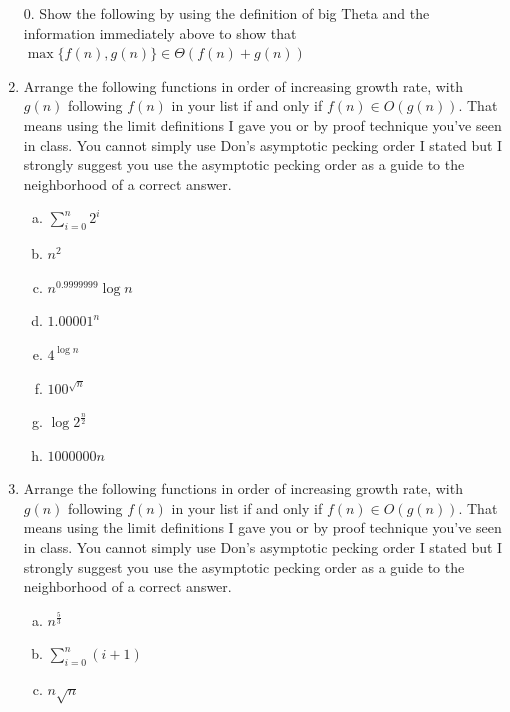 \documentclass[12pt]{article}
\begin{document}
\begin{enumerate}
\item[0. ] Show the following by using the definition of big Theta and the information immediately above to show that $\max\{f(n),g(n)\}\in\Theta(f(n) + g(n))$
\newpage
\item Arrange the following functions in order of increasing growth rate, with $g(n)$ following $f(n)$ 
in your list if and only if $f(n) \in O(g(n))$. That means using the limit definitions I gave you or by proof 
technique you've seen in class. You cannot simply use Don's asymptotic pecking order I stated but I strongly 
suggest you use the asymptotic pecking order as a guide to the neighborhood of a correct answer.\\
\begin{enumerate}[a)]
\item $\sum\limits_{i = 0}^{n} 2^i$\\
\item $n^2$\\
\item $n^{0.9999999}\log{n}$\\
\item $1.00001^n$\\
\item $4^{\log{n}}$\\
\item $100^{\sqrt{n}}$\\
\item $\log{2^{\frac{n}{2}}}$\\
\item $1000000n$\\
\end{enumerate}
\newpage
\item Arrange the following functions in order of increasing growth rate, with $g(n)$ following $f(n)$ in your list if and only if $f(n) \in O(g(n))$. That means using the limit definitions I gave you or by proof technique you've seen in class. You cannot simply use Don's asymptotic pecking order I stated but I strongly suggest you use the asymptotic pecking order as a guide to the neighborhood of a correct answer.\\
\begin{enumerate}[a)]
\item  $n^{\frac{5}{3}}$\\
\item $\sum\limits_{i = 0}^{n} (i + 1)$\\
\item $n\sqrt{n}$\\

\end{enumerate}
\end{enumerate}
\end{document}
